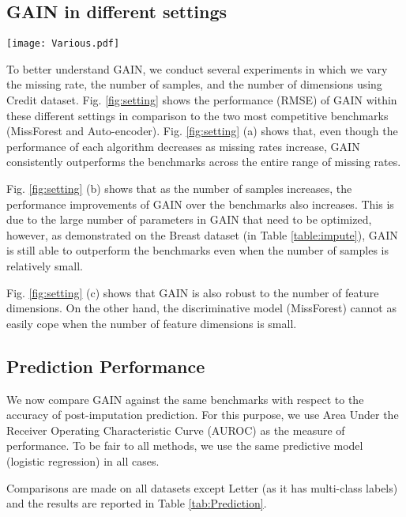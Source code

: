 \documentclass{article}
\begin{document}
\subsection{GAIN in different settings}
    \begin{figure*}[t!]
    \centering
    \texttt{[image: Various.pdf]}
    \caption{RMSE performance in different settings: (a) Various missing rates, (b) Various number of samples, (c) Various feature dimensions}
    \label{fig:setting}
    \end{figure*}
To better understand GAIN, we conduct several experiments in which we vary the
missing rate, the number of samples, and the number of dimensions
using Credit dataset. Fig. \ref{fig:setting} shows the performance
(RMSE) of GAIN within these different settings in comparison to the two most competitive benchmarks (MissForest and Auto-encoder). Fig. \ref{fig:setting} (a) shows that, even though the performance of each algorithm decreases as missing rates increase, GAIN consistently outperforms the benchmarks across the entire range of missing rates.

Fig. \ref{fig:setting} (b) shows that as the number of samples increases, the performance improvements of GAIN over the benchmarks also increases. This is due to the large number of parameters in GAIN that need to be optimized, however, as demonstrated on the Breast dataset (in Table \ref{table:impute}), GAIN is still able to outperform the benchmarks even when the number of samples is relatively small.

Fig. \ref{fig:setting} (c) shows that GAIN is also robust to the number of feature dimensions. On the other hand, the discriminative model (MissForest) cannot as easily cope when the number of feature dimensions is small.

\subsection{Prediction Performance}
We now compare GAIN against the same benchmarks with respect to the accuracy of post-imputation prediction. For this purpose, we use Area Under the Receiver Operating Characteristic Curve (AUROC) as the measure of performance. To be fair to all methods, we use the same predictive model (logistic regression) in all cases.

Comparisons are made on all datasets except Letter (as it has multi-class labels) and the results are reported in Table \ref{tab:Prediction}.
\end{document}

